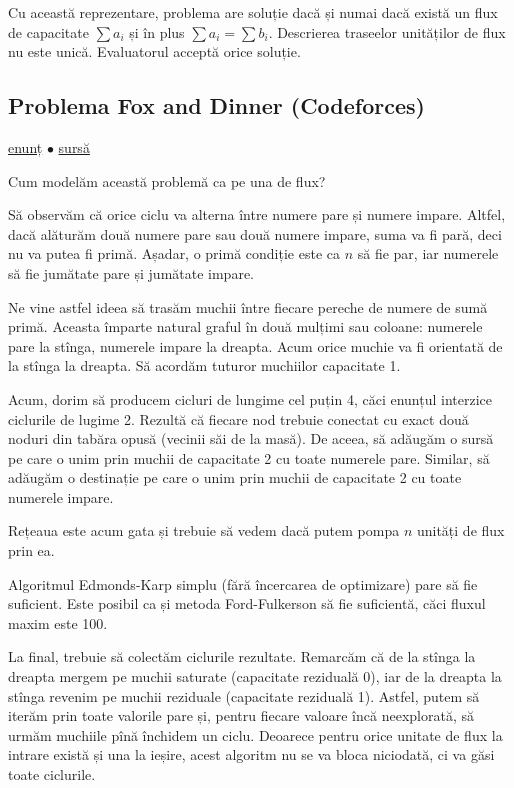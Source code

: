 \documentclass[../main.tex]{subfiles}
\begin{document}
Cu această reprezentare, problema are soluție dacă și numai dacă există un flux de capacitate $\sum a_i$ și în plus $\sum a_i = \sum b_i$. Descrierea traseelor unităților de flux nu este unică. Evaluatorul acceptă orice soluție.


\subsection{Problema Fox and Dinner (Codeforces)}
\label{problem:fox-and-dinner}

\href{https://codeforces.com/contest/510/problem/E}{enunț}
$\bullet$
\hyperref[code:fox-and-dinner]{sursă}

Cum modelăm această problemă ca pe una de flux?

Să observăm că orice ciclu va alterna între numere pare și numere impare. Altfel, dacă alăturăm două numere pare sau două numere impare, suma va fi pară, deci nu va putea fi primă. Așadar, o primă condiție este ca $n$ să fie par, iar numerele să fie jumătate pare și jumătate impare.

Ne vine astfel ideea să trasăm muchii între fiecare pereche de numere de sumă primă. Aceasta împarte natural graful în două mulțimi sau coloane: numerele pare la stînga, numerele impare la dreapta. Acum orice muchie va fi orientată de la stînga la dreapta. Să acordăm tuturor muchiilor capacitate 1.

Acum, dorim să producem cicluri de lungime cel puțin 4, căci enunțul interzice ciclurile de lugime 2. Rezultă că fiecare nod trebuie conectat cu exact două noduri din tabăra opusă (vecinii săi de la masă). De aceea, să adăugăm o sursă pe care o unim prin muchii de capacitate 2 cu toate numerele pare. Similar, să adăugăm o destinație pe care o unim prin muchii de capacitate 2 cu toate numerele impare.

Rețeaua este acum gata și trebuie să vedem dacă putem pompa $n$ unități de flux prin ea.

Algoritmul Edmonds-Karp simplu (fără încercarea de optimizare) pare să fie suficient. Este posibil ca și metoda Ford-Fulkerson să fie suficientă, căci fluxul maxim este 100.

La final, trebuie să colectăm ciclurile rezultate. Remarcăm că de la stînga la dreapta mergem pe muchii saturate (capacitate reziduală 0), iar de la dreapta la stînga revenim pe muchii reziduale (capacitate reziduală 1). Astfel, putem să iterăm prin toate valorile pare și, pentru fiecare valoare încă neexplorată, să urmăm muchiile pînă închidem un ciclu. Deoarece pentru orice unitate de flux la intrare există și una la ieșire, acest algoritm nu se va bloca niciodată, ci va găsi toate ciclurile.
\end{document}
